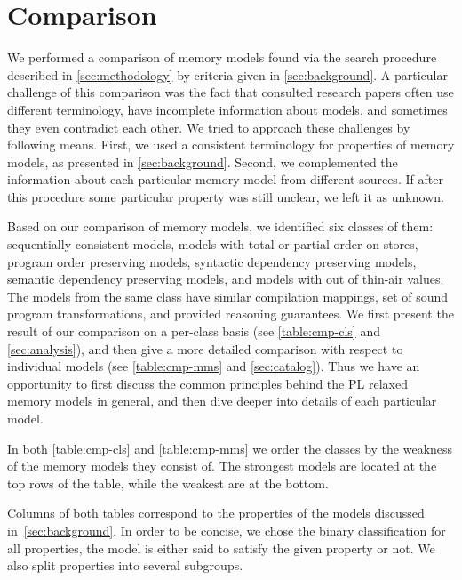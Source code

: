 \section{Comparison}
\label{sec:comparison}

We performed a comparison of memory models 
found via the search procedure described in \cref{sec:methodology} 
by criteria given in \cref{sec:background}. 
A particular challenge of this comparison was the fact that 
consulted research papers often use different terminology, 
have incomplete information about models, and 
sometimes they even contradict each other. 
We tried to approach these challenges by following means.
First, we used a consistent terminology 
for properties of memory models, as presented in \cref{sec:background}.
Second, we complemented the information about 
each particular memory model from different sources.
If after this procedure some particular property was still unclear, 
we left it as unknown. 

Based on our comparison of memory models, 
we identified six classes of them:
sequentially consistent models,
models with total or partial order on stores,
program order preserving models, 
syntactic dependency preserving models, 
semantic dependency preserving models, 
and models with out of thin-air values. 
The models from the same class have similar compilation mappings, 
set of sound program transformations, and provided reasoning guarantees.
We first present the result of our comparison on a per-class basis 
(see \cref{table:cmp-cls} and \cref{sec:analysis}), and 
then give a more detailed comparison with respect to individual models
(see \cref{table:cmp-mms} and \cref{sec:catalog}).
Thus we have an opportunity to first discuss the common principles
behind the PL relaxed memory models in general, and then dive deeper 
into details of each particular model. 

In both \cref{table:cmp-cls} and \cref{table:cmp-mms} we order
the classes by the weakness of the memory models they consist of.  
The strongest models are located at the top rows of the table, 
while the weakest are at the bottom.  

Columns of both tables correspond to the properties 
of the models discussed in~\cref{sec:background}.
In order to be concise, we chose the binary classification for all properties,
\ie the model is either said to satisfy the given property or not.  
We also split properties into several subgroups.

